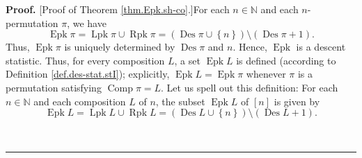 \documentclass[numbers=enddot,12pt,final,onecolumn,notitlepage]{scrartcl}%
\theoremstyle{definition}
\newenvironment{proof}[1][Proof]{\noindent\textbf{#1.} }{\ \rule{0.5em}{0.5em}}
\begin{document}
\begin{proof}
[Proof of Theorem \ref{thm.Epk.sh-co}.]For each $n\in\mathbb{N}$ and each
$n$-permutation $\pi$, we have%
\[
\operatorname*{Epk}\pi=\operatorname*{Lpk}\pi\cup\operatorname*{Rpk}%
\pi=\left(  \operatorname*{Des}\pi\cup\left\{  n\right\}  \right)
\setminus\left(  \operatorname*{Des}\pi+1\right)  .
\]
Thus, $\operatorname*{Epk}\pi$ is uniquely determined by $\operatorname*{Des}%
\pi$ and $n$. Hence, $\operatorname*{Epk}$ is a descent statistic. Thus, for
every composition $L$, a set $\operatorname*{Epk}L$ is defined (according to
Definition \ref{def.des-stat.stI}); explicitly, $\operatorname*{Epk}%
L=\operatorname*{Epk}\pi$ whenever $\pi$ is a permutation satisfying
$\operatorname*{Comp}\pi=L$. Let us spell out this definition: For each
$n\in\mathbb{N}$ and each composition $L$ of $n$, the subset
$\operatorname*{Epk}L$ of $\left[  n\right]  $ is given by%
\[
\operatorname*{Epk}L=\operatorname*{Lpk}L\cup\operatorname*{Rpk}L=\left(
\operatorname*{Des}L\cup\left\{  n\right\}  \right)  \setminus\left(
\operatorname*{Des}L+1\right)  .
\]



\end{proof}
\end{document}
